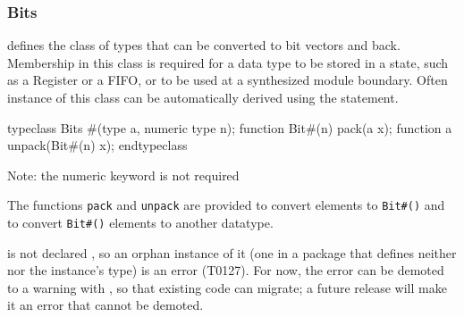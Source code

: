 \subsubsection{Bits}

 defines the class of types that can be converted to bit
vectors  and back.  Membership in this class is required for a data
type to be stored in a state, such as  a Register or a FIFO, or to be used
at a synthesized module boundary.   Often instance of this
class can be automatically derived using the  statement.


\begin{libverbatim}
   typeclass Bits #(type a, numeric type n);
       function Bit#(n) pack(a x);
       function a unpack(Bit#(n) x);
   endtypeclass
\end{libverbatim}
Note: the numeric keyword is not required

The functions {\tt pack} and {\tt unpack} are provided to convert
elements to {\tt Bit\#()} and to convert {\tt Bit\#()} elements to another datatype.

 is not declared , so an orphan instance of it (one
in a package that defines neither  nor the instance's type) is
an error (T0127).  For now, the error can be demoted to a warning with
, so that existing code can migrate; a future
release will make it an error that cannot be demoted.

